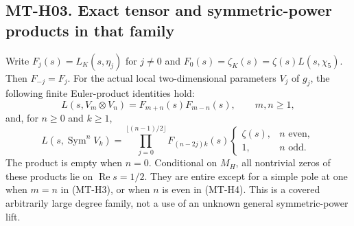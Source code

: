 \documentclass[11pt,a4paper]{article}
\begin{document}
\subsection*{MT-H03. Exact tensor and symmetric-power products in that family}
Write $F_j(s)=L_K(s,\eta_j)$ for $j\ne0$ and
$F_0(s)=\zeta_K(s)=\zeta(s)L(s,\chi_5)$. Then $F_{-j}=F_j$.
For the actual local two-dimensional parameters $V_j$ of $g_j$, the
following finite Euler-product identities hold:
\[
 L(s,V_m\otimes V_n)=F_{m+n}(s)F_{m-n}(s),\qquad m,n\ge1,
                                                               \tag{MT-H3}
\]
and, for $n\ge0$ and $k\ge1$,
\[
 L(s,\operatorname{Sym}^n V_k)=
 \prod_{j=0}^{\lfloor(n-1)/2\rfloor}F_{(n-2j)k}(s)
 \begin{cases}\zeta(s),&n\text{ even},\\1,&n\text{ odd}.
 \end{cases}                                                   \tag{MT-H4}
\]
The product is empty when $n=0$. Conditional on $M_H$, all nontrivial
zeros of these products lie on $\operatorname{Re}s=1/2$. They are
entire except for a simple pole at one when $m=n$ in (MT-H3), or
when $n$ is even in (MT-H4). This is a covered arbitrarily large
degree family, not a use of an unknown general symmetric-power lift.
\end{document}

